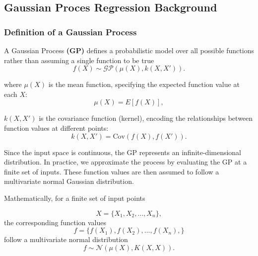 \documentclass[10pt]{article}
\begin{document}
\subsection{Gaussian Proces Regression Background}
\label{sec: GP_backgroound}

\subsubsection*{Definition of a Gaussian Process}
\label{sec: Definition_of_GP}

A Gaussian Process \textbf{(GP)} defines a probabilistic model over all possible functions rather than assuming a single function to be true
\begin{equation}
f(X) \sim \mathcal{GP} (\mu(X), k(X, X')).
\label{eq: Initial_GP_distribution}
\end{equation}

\noindent
where \( \mu(X) \) is the mean function, specifying the expected function value at each \( X \):
\begin{equation}
    \mu(X) = {E}[f(X)],
    \label{eq: meandef}
\end{equation}

\noindent
 \( k(X, X') \) is the covariance function (kernel), encoding the relationships between function values at different points:
\begin{equation}
    k(X, X') = \text{Cov}(f(X), f(X')).
    \label{eq: kerneldef}
\end{equation}

\noindent
Since the input space is continuous, the GP represents an infinite-dimensional distribution. 
In practice, we approximate the process by evaluating the GP at a finite set of inputs.
These function values are then assumed to follow a multivariate normal Gaussian distribution.

\noindent
Mathematically, for a finite set of input points

\begin{equation}
X = \{X_1, X_2, \dots, X_n\},
\end{equation}
 the corresponding function values
\begin{equation}
f = \{f(X_1),f(X_2),...,f(X_n), \}
\end{equation}
follow a multivariate normal distribution
\begin{equation}
f \sim \mathcal{N}\left(\mu(X), K(X, X)\right).
\label{eq: Multivariate_distribution}
\end{equation}
\end{document}
